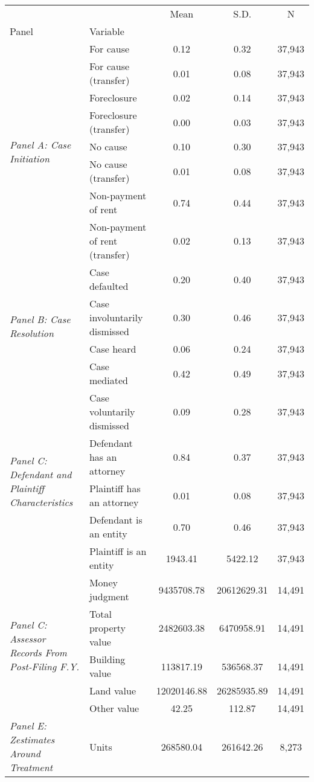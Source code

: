 \begin{tabular}{llccc}
\toprule
 &  & Mean & S.D. & N \\
Panel & Variable &  &  &  \\
\midrule
\multirow[c]{8}{4cm}{\textit{Panel A: Case Initiation}} & For cause & 0.12 & 0.32 & 37,943 \\
 & For cause (transfer) & 0.01 & 0.08 & 37,943 \\
 & Foreclosure & 0.02 & 0.14 & 37,943 \\
 & Foreclosure (transfer) & 0.00 & 0.03 & 37,943 \\
 & No cause & 0.10 & 0.30 & 37,943 \\
 & No cause (transfer) & 0.01 & 0.08 & 37,943 \\
 & Non-payment of rent & 0.74 & 0.44 & 37,943 \\
 & Non-payment of rent (transfer) & 0.02 & 0.13 & 37,943 \\
\cline{1-5}
\multirow[c]{4}{4cm}{\textit{Panel B: Case Resolution}} & Case defaulted & 0.20 & 0.40 & 37,943 \\
 & Case involuntarily dismissed & 0.30 & 0.46 & 37,943 \\
 & Case heard & 0.06 & 0.24 & 37,943 \\
 & Case mediated & 0.42 & 0.49 & 37,943 \\
\cline{1-5}
\multirow[c]{5}{4cm}{\textit{Panel C: Defendant and Plaintiff Characteristics}} & Case voluntarily dismissed & 0.09 & 0.28 & 37,943 \\
 & Defendant has an attorney & 0.84 & 0.37 & 37,943 \\
 & Plaintiff has an attorney & 0.01 & 0.08 & 37,943 \\
 & Defendant is an entity & 0.70 & 0.46 & 37,943 \\
 & Plaintiff is an entity & 1943.41 & 5422.12 & 37,943 \\
\cline{1-5}
\multirow[c]{5}{4cm}{\textit{Panel C: Assessor Records From Post-Filing F.Y.}} & Money judgment & 9435708.78 & 20612629.31 & 14,491 \\
 & Total property value & 2482603.38 & 6470958.91 & 14,491 \\
 & Building value & 113817.19 & 536568.37 & 14,491 \\
 & Land value & 12020146.88 & 26285935.89 & 14,491 \\
 & Other value & 42.25 & 112.87 & 14,491 \\
\cline{1-5}
\multirow[c]{9}{4cm}{\textit{Panel E: Zestimates Around Treatment}} & Units & 268580.04 & 261642.26 & 8,273 \\

\end{tabular}
